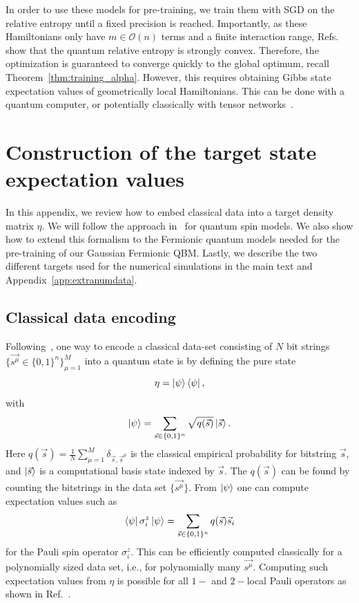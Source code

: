 \documentclass[
    aps,
    prx,
    onecolumn
]{revtex4-2}
\begin{document}
In order to use these models for pre-training, we train them with SGD on the relative entropy until a fixed precision is reached. Importantly, as these Hamiltonians only have $m \in \mathcal{O}(n)$ terms and a finite interaction range, Refs.~\cite{Anshu_2021, Haah2022} show that the quantum relative entropy is strongly convex. Therefore, the optimization is guaranteed to converge quickly to the global optimum, recall Theorem~\ref{thm:training_alpha}. However, this requires obtaining Gibbs state expectation values of geometrically local Hamiltonians. This can be done with a quantum computer, or potentially classically with tensor networks~\cite{Kuwahara2021, Alhambra_2021}. 

\section{Construction of the target state expectation values}
\label{app:dataencoding}
In this appendix, we review how to embed classical data into a target density matrix $\eta$. We will follow the approach in~\cite{Kappen_2020} for quantum spin models. We also show how to extend this formalism to the Fermionic quantum models needed for the pre-training of our Gaussian Fermionic QBM. Lastly, we describe the two different targets used for the numerical simulations in the main text and Appendix~\ref{app:extranumdata}.

\subsection{Classical data encoding}
Following~\cite{Kappen_2020}, one way to encode a classical data-set consisting of $N$ bit strings $\{\vec{s^\mu}\in\{0,1\}^n\}_{\mu=1}^M$ into a quantum state is by defining the pure state \begin{equation}
    \eta = \ket{\psi}\bra{\psi},
\end{equation} with
\begin{equation}
    \ket{\psi} = \sum_{\vec{s}\in\{0,1\}^n} \sqrt{q(\vec{s})}\ket{\vec{s}}. 
\end{equation} Here $q(\vec{s})=\frac{1}{N}\sum_{\mu=1}^M\delta_{\vec{s}, \vec{s}^\mu}$ is the classical empirical probability for bitstring $\vec{s}$, and $\ket{\vec{s}}$ is a computational basis state indexed by $\vec{s}$. The $q(\vec{s})$ can be found by counting the bitstrings in the data set $\{\vec{s^\mu}\}$. From $\ket{\psi}$ one can compute expectation values such as \begin{equation} 
\bra{\psi}\sigma^z_i\ket{\psi} = \sum_{\vec{s}\in\{0,1\}^n}q(\vec{s})\vec{s}_i
\end{equation} for the Pauli spin operator $\sigma^z_i$. This can be efficiently computed classically for a polynomially sized data set, i.e., for polynomially many $\vec{s^\mu}$. Computing such expectation values from $\eta$ is possible for all $1-$ and $2-$local Pauli operators as shown in Ref.~\cite{Kappen_2020}. 
\end{document}
